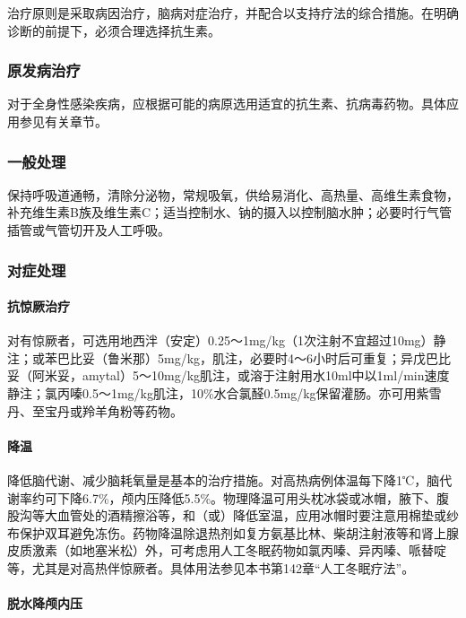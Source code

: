 治疗原则是采取病因治疗，脑病对症治疗，并配合以支持疗法的综合措施。在明确诊断的前提下，必须合理选择抗生素。

\subsubsection{原发病治疗}

对于全身性感染疾病，应根据可能的病原选用适宜的抗生素、抗病毒药物。具体应用参见有关章节。

\subsubsection{一般处理}

保持呼吸道通畅，清除分泌物，常规吸氧，供给易消化、高热量、高维生素食物，补充维生素B族及维生素C；适当控制水、钠的摄入以控制脑水肿；必要时行气管插管或气管切开及人工呼吸。

\subsubsection{对症处理}

\paragraph{抗惊厥治疗}

对有惊厥者，可选用地西泮（安定）0.25～1mg/kg（1次注射不宜超过10mg）静注；或苯巴比妥（鲁米那）5mg/kg，肌注，必要时4～6小时后可重复；异戊巴比妥（阿米妥，amytal）5～10mg/kg肌注，或溶于注射用水10ml中以1ml/min速度静注；氯丙嗪0.5～1mg/kg肌注，10\%水合氯醛0.5mg/kg保留灌肠。亦可用紫雪丹、至宝丹或羚羊角粉等药物。

\paragraph{降温}

降低脑代谢、减少脑耗氧量是基本的治疗措施。对高热病例体温每下降1℃，脑代谢率约可下降6.7\%，颅内压降低5.5\%。物理降温可用头枕冰袋或冰帽，腋下、腹股沟等大血管处的酒精擦浴等，和（或）降低室温，应用冰帽时要注意用棉垫或纱布保护双耳避免冻伤。药物降温除退热剂如复方氨基比林、柴胡注射液等和肾上腺皮质激素（如地塞米松）外，可考虑用人工冬眠药物如氯丙嗪、异丙嗪、哌替啶等，尤其是对高热伴惊厥者。具体用法参见本书第142章“人工冬眠疗法”。

\paragraph{脱水降颅内压}

